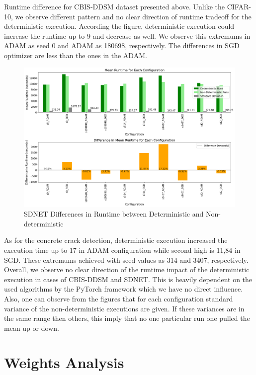 Runtime difference for CBIS-DDSM dataset presented above. Unlike the CIFAR-10, we observe different pattern and no clear direction of runtime tradeoff for the deterministic execution. According the figure, deterministic execution could increase the runtime up to 9 and decrease as well. We observe this extremums in ADAM as seed 0 and ADAM as 180698, respectively. The differences in SGD optimizer are less than the ones in the ADAM. 

\begin{figure}[h!]
    \centering
    \includegraphics[width=1\textwidth]{figures/crack_runtime.png}
    \caption{SDNET Differences in Runtime between Deterministic and Non-deterministic}
    \label{fig:sdnet_dif_run}
\end{figure}

As for the concrete crack detection, deterministic execution increased the execution time up to 17 in ADAM configuration while second high is 11,84 in SGD. These extremums achieved with seed values as 314 and 3407, respectively.\\

Overall, we observe no clear direction of the runtime impact of the deterministic execution in cases of CBIS-DDSM and SDNET. This is heavily dependent on the used algorithms by the PyTorch framework which we have no direct influence. Also, one can observe from the figures that for each configuration standard variance of the non-deterministic executions are given. If these variances are in the same range then others, this imply that no one particular run one pulled the mean up or down.\\

\section{Weights Analysis} 

